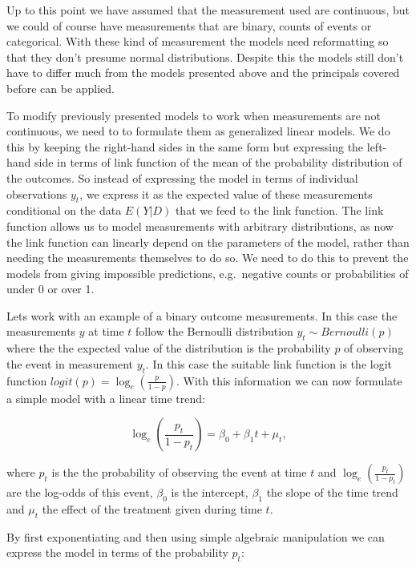 \documentclass[12pt,a4paper,leqno]{report}
\theoremstyle{plain}
\theoremstyle{definition}
\theoremstyle{remark}
\begin{document}
Up to this point we have assumed that the measurement used are continuous, but we
could of course have measurements that are binary, counts of events or categorical.
With these kind of measurement the models need reformatting so that they don't
presume normal distributions. Despite this the models still don't have to differ much
from the models presented above and the principals covered before can be applied.

To modify previously presented models to work when measurements are not continuous, we need to to formulate them
as generalized linear models. We do this by keeping the right-hand sides in the same form but expressing the left-hand
side in terms of link function of the mean of the probability distribution of the outcomes.
So instead of expressing the model in terms
of individual observations \(y_t\), we express it as the expected value of these measurements conditional
on the data \(E(Y|D)\) that we feed to the link function.
The link function allows us to model measurements with arbitrary distributions, as now the link function can linearly depend on the parameters of the model,
rather than needing the measurements themselves to do so. We need to do this to prevent the models from giving impossible predictions,
e.g.\ negative counts or probabilities of under 0 or over 1.

Lets work with an example of a binary outcome measurements. In this case the measurements \(y\) at time \(t\) follow the Bernoulli distribution \(y_t \sim Bernoulli(p)\)
where the the expected value of the distribution is the probability \(p\) of observing the event in measurement \(y_t\). In this case the suitable link function is the logit
function \(logit(p)=\log_e(\frac{p}{1-p})\). With this information we can now formulate a simple model with a linear time trend:

\begin{def}\label{}
    \begin{equation}
        \log_e(\frac{p_t}{1-p_t})=\beta_0 + \beta_1 t + \mu_t,
    \end{equation}
\end{def}where \(p_t\) is the the probability of observing the event at time \(t\) and \(\log_e(\frac{p_t}{1-p_t})\) are the log-odds of this event,
\(\beta_0\) is the intercept, \(\beta_1\) the slope of the time trend and \(\mu_t\) the
effect of the treatment given during time \(t\).

By first exponentiating and then using simple algebraic manipulation we can
express the model in terms of the probability \(p_t\):
\end{document}
